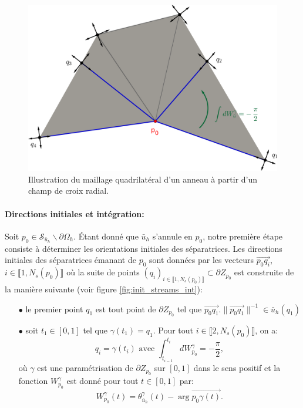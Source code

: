 \begin{figure}[!h]
\centering
\includegraphics[scale=0.755]{images/triangle separatrices bord.png}
\caption{Illustration du maillage quadrilatéral d'un anneau à partir d'un champ de croix radial.}
\label{fig:init_streams_bord}
\end{figure}

\paragraph{Directions initiales et intégration:}

Soit $p_0\in\mathcal{S}_{\bar{u}_h}\backslash\partial\Omega_h$. Étant donné que $\bar{u}_h$ s'annule en $p_0$, notre première étape consiste à déterminer les orientations initiales des séparatrices. Les directions initiales des séparatrices émanant de $p_0$ sont données par les vecteurs $\overrightarrow{p_0q_i}$, $i\in\llbracket 1, N_s(p_0) \rrbracket$ où la suite de points $(q_i)_{i\in\llbracket 1, N_s(p_0)\rrbracket}\subset\partial Z_{p_0}$ est construite de la manière suivante (voir figure \ref{fig:init_streams_int}):\\
\begin{itemize}
    \item[$\bullet$] le premier point $q_1$ est tout point de $\partial Z_{p_0}$ tel que $\overrightarrow{p_0q_1}.\|\overrightarrow{p_0q_1}\|^{-1}\in\bar{u}_h(q_1)$\\
    \item[$\bullet$] soit $t_1\in[0, 1]$ tel que $\gamma(t_1)=q_1$. Pour tout $i\in\llbracket 2, N_s(p_0)\rrbracket$, on a:
    $$
    q_i=\gamma(t_i)\mbox{ avec }\int_{t_{i-1}}^{t_i}dW_{p_0}^\gamma=-\frac{\pi}{2},
    $$
    où $\gamma$ est une paramétrisation de $\partial Z_{p_0}$ sur $[0, 1]$ dans le sens positif et la fonction $W^\gamma_{p_0}$ est donné pour tout $t\in[0, 1]$ par:
    $$
    W_{p_0}^\gamma(t)=\theta^\gamma_{\bar{u}_h}(t)-\arg \overrightarrow{p_0\gamma(t)}.
    $$
\end{itemize}

